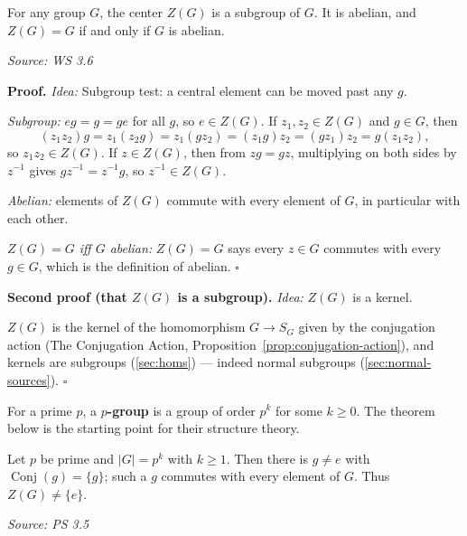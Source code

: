 \documentclass[11pt]{report}
\renewenvironment{proof}[1][Proof]{\noindent\textbf{#1.} }{\hfill$\square$\par\vspace{5pt}}
\newcommand{\srcline}[1]{\par\hfill{\footnotesize\textit{Source: #1}}}
\begin{document}
\begin{propbox}\label{prop:center-subgroup}
For any group $G$, the center $Z(G)$ is a subgroup of $G$. It is abelian, and $Z(G) = G$ if and only if $G$ is abelian.
\srcline{WS 3.6}
\end{propbox}

\begin{proof}
\textit{Idea:} Subgroup test: a central element can be moved past any $g$.\par
\emph{Subgroup:} $eg = g = ge$ for all $g$, so $e \in Z(G)$. If $z_1, z_2 \in Z(G)$ and $g \in G$, then
\[ (z_1z_2)g = z_1(z_2g) = z_1(gz_2) = (z_1g)z_2 = (gz_1)z_2 = g(z_1z_2), \]
so $z_1z_2 \in Z(G)$. If $z \in Z(G)$, then from $zg = gz$, multiplying on both sides by $z^{-1}$ gives $gz^{-1} = z^{-1}g$, so $z^{-1} \in Z(G)$.

\emph{Abelian:} elements of $Z(G)$ commute with every element of $G$, in particular with each other.

\emph{$Z(G) = G$ iff $G$ abelian:} $Z(G) = G$ says every $z \in G$ commutes with every $g \in G$, which is the definition of abelian.
\end{proof}

\begin{proof}[Second proof (that $Z(G)$ is a subgroup)]
\textit{Idea:} $Z(G)$ is a kernel.\par
$Z(G)$ is the kernel of the homomorphism $G \to S_G$ given by the conjugation action (The Conjugation Action, Proposition~\ref{prop:conjugation-action}), and kernels are subgroups (\ref{sec:homs}) --- indeed normal subgroups (\ref{sec:normal-sources}).
\end{proof}

\begin{defbox}[{$p$-Group}]\label{def:p-group}
For a prime $p$, a \textbf{$p$-group} is a group of order $p^k$ for some $k \geq 0$. The theorem below is the starting point for their structure theory.
\end{defbox}

\begin{thmbox}\label{thm:groups-prime-power-order-have-nontrivial-center}
Let $p$ be prime and $|G| = p^k$ with $k \geq 1$. Then there is $g \neq e$ with $\operatorname{Conj}(g) = \{g\}$; such a $g$ commutes with every element of $G$. Thus $Z(G) \neq \{e\}$.
\srcline{PS 3.5}
\end{thmbox}
\end{document}
